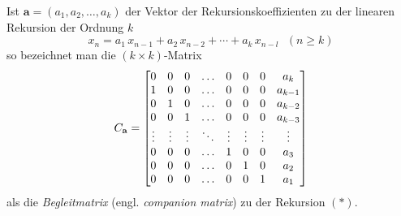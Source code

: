 
Ist ${\mathbf a} = (a_1,a_2,\ldots,a_k)$ der Vektor der Rekursionskoeffizienten zu
der linearen Rekursion der Ordnung $k$
\begin{equation*}
x_{n} = a_1 \, x_{n-1} + a_2 \, x_{n-2} + \cdots + a_k \, x_{n-l}~~~(n \geq k)
\tag{$*$}
\end{equation*}
so bezeichnet man die $(k \times k)$-Matrix
\[
C_{{\mathbf a}} = \begin{bmatrix}
0 & 0 & 0 &    \ldots & 0& 0& 0  & a_k \cr
1 & 0 & 0 &    \ldots & 0& 0& 0  & a_{k-1} \cr
0 & 1 & 0 &   \ldots & 0& 0& 0 & a_{k-2} \cr
0 & 0 & 1 &   \ldots & 0& 0& 0 & a_{k-3} \cr
\vdots & \vdots    & \vdots & \ddots & \vdots&  \vdots &\vdots & \vdots \cr
0 & 0 & 0 &  \ldots &1 & 0 & 0 & a_3 \cr
0 & 0 & 0 &    \ldots &0 & 1& 0 & a_2 \cr
0 & 0 & 0 &   \ldots &0 & 0& 1 & a_1
\end{bmatrix}
\]
als die \emph{Begleitmatrix} (engl. \emph{companion matrix}) zu der Rekursion $(*)$.

